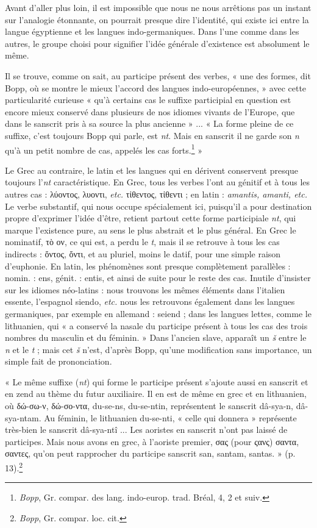 \documentclass[a4paper, 11pt, oneside]{article}
\begin{document}
Avant d'aller plus loin, il est impossible que nous ne nous arrêtions pas un instant sur l'analogie étonnante, on pourrait presque dire l'identité, qui existe ici entre la langue égyptienne et les langues indo-germaniques. Dans l'une comme dans les autres, le groupe choisi pour signifier l'idée générale d'existence est absolument le même.

Il se trouve, comme on sait, au participe présent des verbes, « une des formes, dit Bopp, où se montre le mieux l'accord des langues indo-européennes, » avec cette particularité curieuse « qu'à certains cas le suffixe participial en question est encore mieux conservé dans plusieurs de nos idiomes vivants de l'Europe, que dans le sanscrit pris à sa source la plus ancienne » ... « La forme pleine de ce suffixe, c'est toujours Bopp qui parle, est \emph{nt}. Mais en sanscrit il ne garde son \emph{n} qu'à un petit nombre de cas, appelés les cas forts.\footnote{\emph{Bopp}, Gr. compar. des lang. indo-europ. trad. Bréal, 4, 2 et suiv.} »

Le Grec au contraire, le latin et les langues qui en dérivent conservent presque toujours l'\emph{nt} caractéristique. En Grec, tous les verbes l'ont au génitif et à tous les autres cas : λύοντος, λυοντι, \emph{etc.} τἰθεντος, τἰθεντι ; en latin : \emph{amantis, amanti, etc.} Le verbe substantif, qui nous occupe spécialement ici, puisqu'il a pour destination propre d'exprimer l'idée d'être, retient partout cette forme participiale \emph{nt}, qui marque l'existence pure, au sens le plus abstrait et le plus général. En Grec le nominatif, τὸ ον, ce qui est, a perdu le \emph{t}, mais il se retrouve à tous les cas indirects : ὄντος, ὄντι, et au pluriel, moins le datif, pour une simple raison d'euphonie. En latin, les phénomènes sont presque complètement parallèles : nomin. : ens, génit. : entis, et ainsi de suite pour le reste des cas. Inutile d'insister sur les idiomes néo-latins : nous trouvons les mêmes éléments dans l'italien essente, l'espagnol siendo, \emph{etc.} nous les retrouvons également dans les langues germaniques, par exemple en allemand : seiend ; dans les langues lettes, comme le lithuanien, qui « a conservé la nasale du participe présent à tous les cas des trois nombres du masculin et du féminin. » Dans l'ancien slave, apparaît un \emph{š} entre le \emph{n} et le \emph{t} ; mais cet \emph{š} n'est, d'après Bopp, qu'une modification sans importance, un simple fait de prononciation.

« Le même suffixe (\emph{nt}) qui forme le participe présent s'ajoute aussi en sanscrit et en zend au thème du futur auxiliaire. Il en est de même en grec et en lithuanien, où δώ-σω-ν, δώ-σο-ντα, du-se-ns, du-se-ntin, représentent le sanscrit dâ-sya-n, dâ-sya-ntam. Au féminin, le lithuanien du-se-nti, « celle qui donnera » représente très-bien le sanscrit dâ-sya-ntî ... Les aoristes en sanscrit n'ont pas laissé de participes. Mais nous avons en grec, à l'aoriste premier, σας (pour ςανς) σαντα, σαντες, qu'on peut rapprocher du participe sanscrit san, santam, santas. » (p. 13).\footnote{\emph{Bopp}, Gr. compar. loc. cit.}
\end{document}
